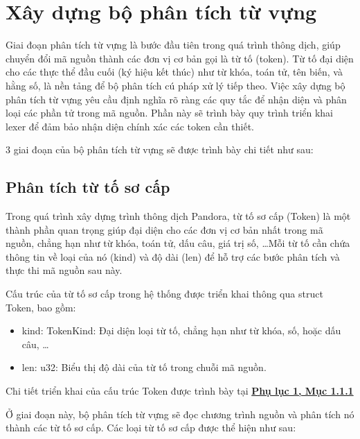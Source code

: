 \section{Xây dựng bộ phân tích từ vựng}
Giai đoạn phân tích từ vựng là bước đầu tiên trong quá trình thông dịch, giúp chuyển đổi mã nguồn thành các đơn vị cơ bản gọi là từ tố (token). Từ tố đại diện cho các thực thể đầu cuối (ký hiệu kết thúc) như từ khóa, toán tử, tên biến, và hằng số, là nền tảng để bộ phân tích cú pháp xử lý tiếp theo. Việc xây dựng bộ phân tích từ vựng yêu cầu định nghĩa rõ ràng các quy tắc để nhận diện và phân loại các phần tử trong mã nguồn. Phần này sẽ trình bày quy trình triển khai lexer để đảm bảo nhận diện chính xác các token cần thiết.

3 giai đoạn của bộ phân tích từ vựng sẽ được trình bày chi tiết như sau:

\subsection{Phân tích từ tố sơ cấp}
Trong quá trình xây dựng trình thông dịch Pandora, từ tố sơ cấp (Token) là một thành phần quan trọng giúp đại diện cho các đơn vị cơ bản nhất trong mã nguồn, chẳng hạn như từ khóa, toán tử, dấu câu, giá trị số, \dots Mỗi từ tố cần chứa thông tin về loại của nó (kind) và độ dài (len) để hỗ trợ các bước phân tích và thực thi mã nguồn sau này.

Cấu trúc của từ tố sơ cấp trong hệ thống được triển khai thông qua struct Token, bao gồm:
\begin{itemize}
  \item kind: TokenKind: Đại diện loại từ tố, chẳng hạn như từ khóa, số, hoặc dấu câu, \dots
  \item len: u32: Biểu thị độ dài của từ tố trong chuỗi mã nguồn.
\end{itemize}
Chi tiết triển khai của cấu trúc Token được trình bày tại \hyperref[ap1:simple_token]{\bfseries Phụ lục 1, Mục 1.1.1}

Ở giai đoạn này, bộ phân tích từ vựng sẽ đọc chương trình nguồn và phân tích nó thành các từ tố sơ cấp. Các loại từ tố sơ cấp được thể hiện như sau:


